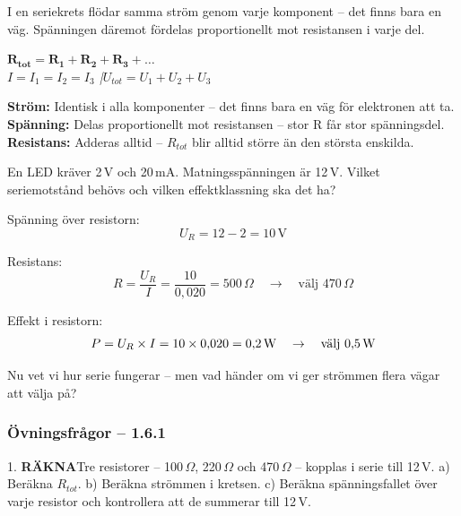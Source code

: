 \documentclass[a4paper,11pt,twoside]{book}
\newcommand{\emoji}[1]{{\emojifont #1}}
\newcommand{\qrakna}{\colorbox{bluepale}{\textcolor{bluedark}{\headingfont\bfseries\tiny RÄKNA}}}
\begin{document}
I en seriekrets flödar samma ström genom varje 
komponent -- det finns bara en väg. Spänningen däremot 
fördelas proportionellt mot resistansen i varje del.

\begin{formulabox}
{\large$\mathbf{R_{tot} = R_1 + R_2 + R_3 + \ldots}$}\\[3mm]
{\small\normalfont\itshape $I = I_1 = I_2 = I_3$ \quad|\quad $U_{tot} = U_1 + U_2 + U_3$}
\end{formulabox}

\begin{bluebox}[title={\emoji{🔑} Nyckelsamband -- serie}]
\textbf{Ström:} Identisk i alla komponenter -- det finns 
bara en väg för elektronen att ta.\\
\textbf{Spänning:} Delas proportionellt mot resistansen 
-- stor R får stor spänningsdel.\\
\textbf{Resistans:} Adderas alltid -- $R_{tot}$ blir 
alltid större än den största enskilda.
\end{bluebox}

\begin{worked}[title={Räkneexempel 1.6.1 -- Spänningsdelare med LED}]
En LED kräver 2\,V och 20\,mA. Matningsspänningen är 
12\,V. Vilket seriemotstånd behövs och vilken 
effektklassning ska det ha?

Spänning över resistorn:
\[ U_R = 12 - 2 = 10\,\text{V} \]

Resistans:
\[ R = \frac{U_R}{I} = \frac{10}{0{,}020} = 500\,\Omega \quad \rightarrow \quad \text{välj }470\,\Omega \]


Effekt i resistorn:
\[ P = U_R \times I = 10 \times 0{,}020 = 0{,}2\,\text{W} \quad \rightarrow \quad \text{välj 0{,}5\,W} \]
\end{worked}

Nu vet vi hur serie fungerar -- men vad händer om vi 
ger strömmen flera vägar att välja på?

\subsubsection*{Övningsfrågor -- 1.6.1}

\begin{qblock}{1.}
\qrakna\quad Tre resistorer -- 100\,$\Omega$, 220\,$\Omega$ 
och 470\,$\Omega$ -- kopplas i serie till 12\,V. 
a) Beräkna $R_{tot}$. 
b) Beräkna strömmen i kretsen. 
c) Beräkna spänningsfallet över varje resistor och 
kontrollera att de summerar till 12\,V.
\end{qblock}
\end{document}
